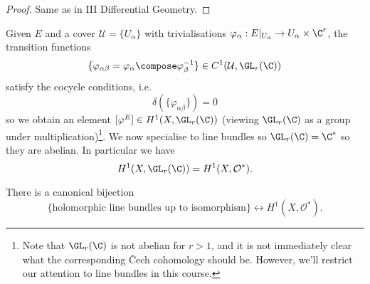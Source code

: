 \documentclass[a4paper]{article}
\begin{document}
\begin{proof}
  Same as in III Differential Geometry.
\end{proof}

Given \(E\) and a cover \(\mathcal U = \{U_\alpha\}\) with trivialisations \(\varphi_\alpha: E|_{U_\alpha} \to U_\alpha \times \C^r\), the transition functions
\[
  \{\varphi_{\alpha\beta} = \varphi_\alpha \compose \varphi_\beta^{-1}\} \in C^1(\mathcal U, \GL_r(\C))
\]
satisfy the cocycle conditions, i.e.
\[
  \delta(\{\varphi_{\alpha\beta}\}) = 0
\]
so we obtain an element \([\varphi^E] \in H^1(X, \GL_r(\C))\) (viewing \(\GL_r(\C)\) as a group under multiplication)\footnote{Note that \(\GL_r(\C)\) is not abelian for \(r > 1\), and it is not immediately clear what the corresponding Čech cohomology should be. However, we'll restrict our attention to line bundles in this course.}. We now specialise to line bundles so \(\GL_r(\C) = \C^*\) so they are abelian. In particular we have
\[
  H^1(X, \GL_r(\C)) = H^1(X, \mathcal O^*).
\]

\begin{proposition}
  There is a canonical bijection
  \[
    \{\text{holomorphic line bundles up to isomorphism}\} \leftrightarrow H^1(X, \mathcal O^*).
  \]
\end{proposition}
\end{document}
